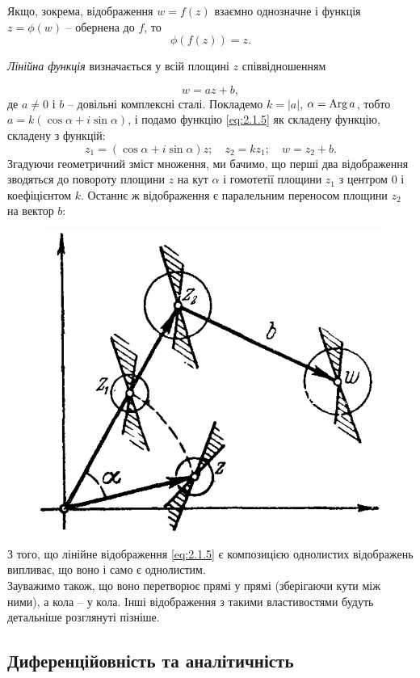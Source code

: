 Якщо, зокрема, відображення $w = f(z)$ взаємно однозначне і функція $z = \phi(w)$ -- обернена до $f$, то
\begin{equation}
	\label{eq:2.1.4}
	\phi(f(z)) = z.
\end{equation}

\begin{example}
	\textit{Лінійна функція} визначається у всій площині $z$ співвідношенням

	\begin{equation}
		\label{eq:2.1.5}
		w = a z + b,
	\end{equation}
	де $a \ne 0$ і $b$ -- довільні комплексні сталі. Покладемо $k = |a|$, $\alpha = \operatorname{Arg} a$, тобто $a = k(\cos \alpha + i \sin \alpha)$, і подамо функцію \eqref{eq:2.1.5} як складену функцію, складену з функцій:
	\begin{equation}
		\label{eq:2.1.6}
		z_1 = (\cos \alpha + i \sin \alpha) z; \quad z_2 = k z_1; \quad w = z_2 + b.
	\end{equation}
	Згадуючи геометричний зміст множення, ми бачимо, що перші два відображення зводяться до повороту площини $z$ на кут $\alpha$ і гомотетії площини $z_1$ з центром 0 і коефіцієнтом $k$. Останнє ж відображення є паралельним переносом площини $z_2$ на вектор $b$:
	\begin{figure}[H]
		\centering
		\includegraphics[width=.4\linewidth]{mal-08.png}
		\label{fig:2.3_5}
	\end{figure}
	З того, що лінійне відображення \eqref{eq:2.1.5} є композицією однолистих відображень випливає, що воно і само є однолистим. \\

	Зауважимо також, що воно перетворює прямі у прямі (зберігаючи кути між ними), а кола -- у кола. Інші відображення з такими властивостями будуть детальніше розглянуті пізніше.
\end{example}

\subsection{Диференційовність та аналітичність}

